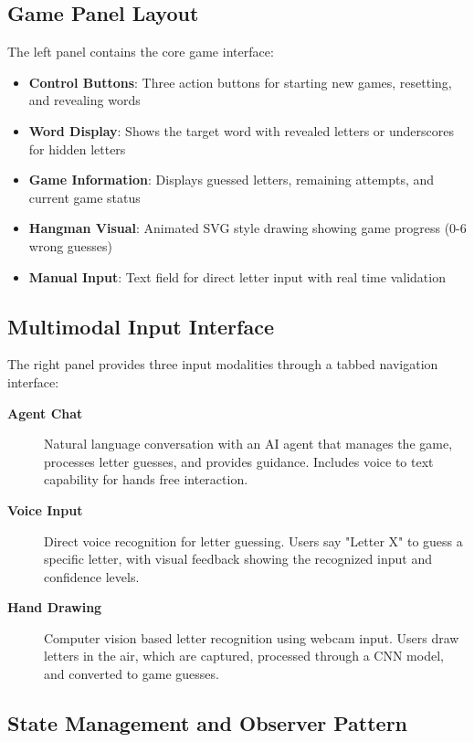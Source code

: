 \subsection*{Game Panel Layout}

The left panel contains the core game interface:

\begin{itemize}
\item \textbf{Control Buttons}: Three action buttons for starting new games, resetting, and revealing words
\item \textbf{Word Display}: Shows the target word with revealed letters or underscores for hidden letters
\item \textbf{Game Information}: Displays guessed letters, remaining attempts, and current game status
\item \textbf{Hangman Visual}: Animated SVG style drawing showing game progress (0-6 wrong guesses)
\item \textbf{Manual Input}: Text field for direct letter input with real time validation
\end{itemize}

\subsection*{Multimodal Input Interface}

The right panel provides three input modalities through a tabbed navigation interface:

\begin{description}
\item[\textbf{Agent Chat}] Natural language conversation with an AI agent that manages the game, processes letter guesses, and provides guidance. Includes voice to text capability for hands free interaction.

\item[\textbf{Voice Input}] Direct voice recognition for letter guessing. Users say "Letter X" to guess a specific letter, with visual feedback showing the recognized input and confidence levels.

\item[\textbf{Hand Drawing}] Computer vision based letter recognition using webcam input. Users draw letters in the air, which are captured, processed through a CNN model, and converted to game guesses.
\end{description}

\subsection*{State Management and Observer Pattern}

